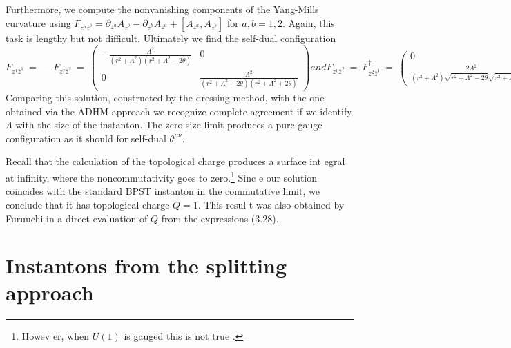 \documentclass[a4paper,11pt,english]{article}
\numberwithin{equation}{section}
\renewcommand{\=}{\ =\ }
\begin{document}
Furthermore, we compute the nonvanishing components of the Yang-Mills curvature
using $F_{z^a\bar{z}^b}=\partial_{z^a}A_{\bar{z}^b}%
-\partial_{\bar{z}^b}A_{z^a}+[A_{z^a},A_{\bar{z}^b}]$
for $a,b=1,2$. 
Again, this task is lengthy but not difficult. 
Ultimately we find the self-dual configuration
\begin{subequations}\label{curv}
\begin{equation}\label{curv1}
 {F}_{z^1\bar{z}^1}\=-{F}_{z^2\bar{z}^2}\=
                           \begin{pmatrix} -\frac{\Lambda^2}{(r^2+\Lambda%
^2)(r^2+\Lambda^2-2\theta)} & 0\\
                           0 & \frac{\Lambda^2}{(r^2+\Lambda^2-2\theta)(r%
^2+\Lambda^2+2\theta)} \end{pmatrix}
\end{equation}
and
\begin{equation}\label{curv2}
 {F}_{z^1\bar{z}^2}\={F}^\dagger_{z^2\bar{z}^1}\=
                           \begin{pmatrix} 0 & 0 \\ %
                           \frac{2\Lambda^2}{(r^2+\Lambda^2)\sqrt{r^2+
\Lambda^2-2\theta}\sqrt{r^2+\Lambda^2+2\theta}} & 0%
                           \end{pmatrix}.
\end{equation}
\end{subequations}
Comparing this solution, constructed by the dressing method, 
with the one obtained via the ADHM approach \cite{Furuuchi:2001dx} 
we recognize complete agreement if we identify $\Lambda$ 
with the size of the instanton. 
The zero-size limit produces a pure-gauge configuration as it should
for self-dual $\theta^{\mu\nu}$.

Recall that the calculation of the topological charge produces a surface int%
egral at infinity, where the noncommutativity goes to zero.\footnote{Howev%
er, when $U(1)$ is gauged this is not true \cite{Furuuchi:2000vc}.} Sinc%
e our solution coincides with the standard BPST instanton in the commutative 
limit, we conclude that it has topological charge $Q=1$. This resul%
t was also obtained by Furuuchi \cite{Furuuchi:2001dx} in a direct evaluation
of $Q$ from the expressions (3.28).


\section{Instantons from the splitting approach}
\end{document}
